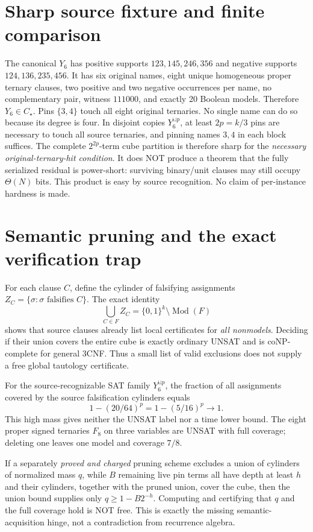 \documentclass[11pt]{article}
\begin{document}
\section{Sharp source fixture and finite comparison}
The canonical $Y_6$ has positive supports
$123,145,246,356$ and negative supports
$124,136,235,456$. It has six original names,
eight unique homogeneous proper ternary clauses,
two positive and two negative occurrences per name,
no complementary pair, witness $111000$, and
exactly 20 Boolean models. Therefore $Y_6\in C_\star$.
Pins $\{3,4\}$ touch all eight original ternaries.
No single name can do so because its degree is four.
In disjoint copies $Y_6^{\sqcup p}$, at least
$2p=k/3$ pins are necessary to touch all source
ternaries, and pinning names $3,4$ in each block
suffices. The complete $2^{2p}$-term cube
partition is therefore sharp for the \emph{necessary
original-ternary-hit condition}. It does NOT
produce a theorem that the fully serialized residual
is power-short: surviving binary/unit clauses may
still occupy $\Theta(N)$ bits.
This product is easy by source recognition.
No claim of per-instance hardness is made.

\section{Semantic pruning and the exact verification trap}
For each clause $C$, define the cylinder of
falsifying assignments
$Z_C=\{\sigma:\sigma\text{ falsifies }C\}$.
The exact identity
\[
 \bigcup_{C\in F}Z_C
    =\{0,1\}^k\setminus\operatorname{Mod}(F)
\]
shows that source clauses already list local
certificates for \emph{all nonmodels}.
Deciding if their union covers the entire cube
is exactly ordinary UNSAT and is coNP-complete for
general 3CNF. Thus a small list of valid exclusions
does not supply a free global tautology certificate.

For the source-recognizable SAT family
$Y_6^{\sqcup p}$, the fraction of all assignments
covered by the source falsification cylinders equals
\[
 1-(20/64)^p=1-(5/16)^p\longrightarrow1.
\]
This high mass gives neither the UNSAT label nor
a time lower bound. The eight proper signed ternaries
$F_8$ on three variables are UNSAT with full coverage;
deleting one leaves one model and coverage $7/8$.

If a separately \emph{proved and charged} pruning
scheme excludes a union of cylinders of normalized
mass $q$, while $B$ remaining live pin terms all
have depth at least $h$ and their cylinders,
together with the pruned union, cover the cube,
then the union bound supplies only
$q\ge1-B2^{-h}$.
Computing and certifying that $q$ and the full
coverage hold is NOT free. This is exactly the
missing semantic-acquisition hinge, not a
contradiction from recurrence algebra.
\end{document}
